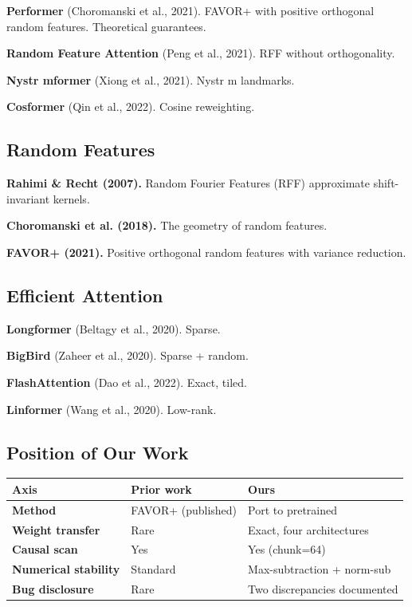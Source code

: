 \textbf{Performer} (Choromanski et al., 2021). FAVOR+ with positive orthogonal 
random features. Theoretical guarantees.

\textbf{Random Feature Attention} (Peng et al., 2021). RFF without orthogonality.

\textbf{Nystr mformer} (Xiong et al., 2021). Nystr m landmarks.

\textbf{Cosformer} (Qin et al., 2022). Cosine reweighting.

\subsection{Random Features}

\textbf{Rahimi \& Recht (2007).} Random Fourier Features (RFF) approximate 
shift-invariant kernels.

\textbf{Choromanski et al. (2018).} The geometry of random features.

\textbf{FAVOR+ (2021).} Positive orthogonal random features with variance 
reduction.

\subsection{Efficient Attention}

\textbf{Longformer} (Beltagy et al., 2020). Sparse.

\textbf{BigBird} (Zaheer et al., 2020). Sparse + random.

\textbf{FlashAttention} (Dao et al., 2022). Exact, tiled.

\textbf{Linformer} (Wang et al., 2020). Low-rank.

\subsection{Position of Our Work}

\begin{table}[H]
\centering
\small
\begin{tabular}{lll}
\toprule
\textbf{Axis} & \textbf{Prior work} & \textbf{Ours} \\
\midrule
\textbf{Method} & FAVOR+ (published) & Port to pretrained \\
\textbf{Weight transfer} & Rare & Exact, four architectures \\
\textbf{Causal scan} & Yes & Yes (chunk=64) \\
\textbf{Numerical stability} & Standard & Max-subtraction + norm-sub \\
\textbf{Bug disclosure} & Rare & Two discrepancies documented \\
\bottomrule
\end{tabular}
\end{table}

